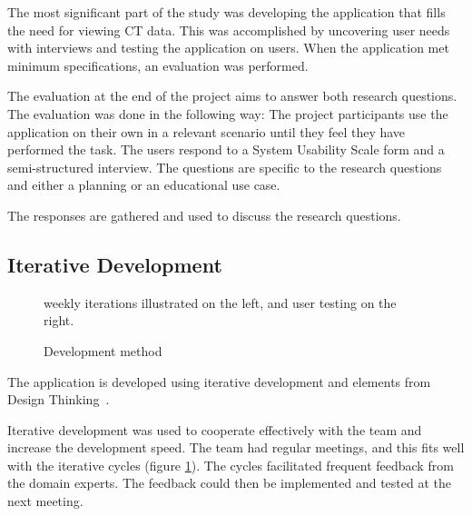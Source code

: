 \documentclass[a4paper]{report}
\begin{document}
The most significant part of the study was developing the application that fills the need for viewing CT data. This was accomplished by uncovering user needs with interviews and testing the application on users. When the application met minimum specifications, an evaluation was performed.

The evaluation at the end of the project aims to answer both research questions. The evaluation was done in the following way:
The project participants use the application on their own in a relevant scenario until they feel they have performed the task.
The users respond to a System Usability Scale form and a semi-structured interview. The questions are specific to the research questions and either a planning or an educational use case.

The responses are gathered and used to discuss the research questions.

\subsection{Iterative Development}

\begin{figure}[h!]
    \centering
	\hfill
  \caption{Development method}
  \label{agile}
  \small
  weekly iterations illustrated on the left, and user testing on the right.
\end{figure}

The application is developed using iterative development and elements from Design Thinking~\cite{razzouk_what_2012}.

Iterative development was used to cooperate effectively with the team and increase the development speed. The team had regular meetings, and this fits well with the iterative cycles (figure \ref{agile}). The cycles facilitated frequent feedback from the domain experts. The feedback could then be implemented and tested at the next meeting.
\end{document}
